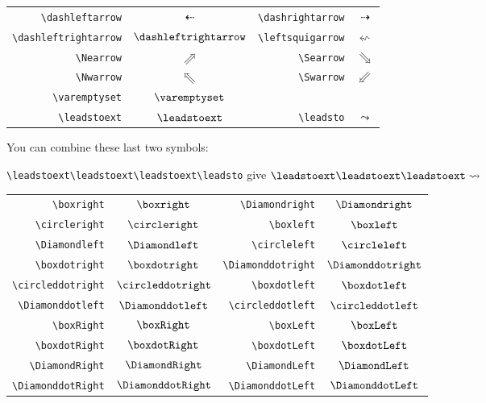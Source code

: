 \documentclass[a4paper,11pt]{article}
\begin{document}
\begin{center}\begin{tabular}{r>{$}c<{$}|r>{$}c<{$}}

\verb=\dashleftarrow=&\dashleftarrow&\verb=\dashrightarrow=&\dashrightarrow\\
\verb=\dashleftrightarrow=&\dashleftrightarrow&\verb=\leftsquigarrow=&\leftsquigarrow\\
\verb=\Nearrow=&\Nearrow&\verb=\Searrow=&\Searrow\\
\verb=\Nwarrow=&\Nwarrow&\verb=\Swarrow=&\Swarrow\\
\verb=\varemptyset=&\varemptyset& & \\
\verb=\leadstoext=&\leadstoext&\verb=\leadsto=&\leadsto\\

\end{tabular}\end{center}

You can combine these last two symbols:

\verb=\leadstoext\leadstoext\leadstoext\leadsto=
give\quad
$\leadstoext\leadstoext\leadstoext\leadsto$

\begin{center}\begin{tabular}{r>{$}c<{$}|r>{$}c<{$}}

\verb=\boxright=&\boxright&\verb=\Diamondright=&\Diamondright\\
\verb=\circleright=&\circleright&\verb=\boxleft=&\boxleft\\
\verb=\Diamondleft=&\Diamondleft&\verb=\circleleft=&\circleleft\\
\verb=\boxdotright=&\boxdotright&\verb=\Diamonddotright=&\Diamonddotright\\
\verb=\circleddotright=&\circleddotright&\verb=\boxdotleft=&\boxdotleft\\
\verb=\Diamonddotleft=&\Diamonddotleft&\verb=\circleddotleft=&\circleddotleft\\
\verb=\boxRight=&\boxRight&\verb=\boxLeft=&\boxLeft\\
\verb=\boxdotRight=&\boxdotRight&\verb=\boxdotLeft=&\boxdotLeft\\
\verb=\DiamondRight=&\DiamondRight&\verb=\DiamondLeft=&\DiamondLeft\\
\verb=\DiamonddotRight=&\DiamonddotRight&\verb=\DiamonddotLeft=&\DiamonddotLeft\\

\end{tabular}\end{center}
\end{document}
